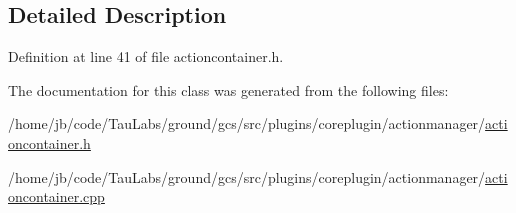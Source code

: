 \subsection{\-Detailed \-Description}


\-Definition at line 41 of file actioncontainer.\-h.



\-The documentation for this class was generated from the following files\-:\begin{DoxyCompactItemize}
\item 
/home/jb/code/\-Tau\-Labs/ground/gcs/src/plugins/coreplugin/actionmanager/\hyperlink{actioncontainer_8h}{actioncontainer.\-h}\item 
/home/jb/code/\-Tau\-Labs/ground/gcs/src/plugins/coreplugin/actionmanager/\hyperlink{actioncontainer_8cpp}{actioncontainer.\-cpp}\end{DoxyCompactItemize}
